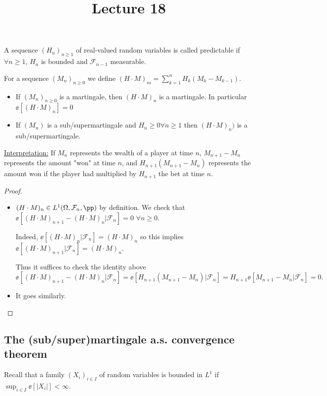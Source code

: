 \documentclass[../main.tex]{subfiles}
\title{Lecture 18}
\begin{document}
\begin{proposition}
  A sequence $(H_n)_{n \geq 1}$ of real-valued random variables is called
  predictable if $\forall n \geq 1$, $H_n$ is bounded and $\mathcal{F}_{n-1}$
  measurable.

  For a sequence $(M_n)_{n \geq 0}$ we define $(H \cdot M)_{m} = \sum_{k=1}^n
  H_k(M_k - M_{k-1})$.
  \begin{itemize}
    \item If $(M_n)_{n \geq 0}$ is a martingale, then $(H \cdot M)_n$ is a
      martingale. In particular $\ee[(H \cdot M)_n] = 0$
    \item If $(M_n)$ is a sub/supermartingale and $H_n \geq 0 \forall n \geq 1$ 
      then  $(H \cdot M)_n)$ is a sub/supermartingale.
  \end{itemize}
\end{proposition}
\underline{Interpretation:} If $M_n$ represents the wealth of a player at time
$n$, $M_{n+1} - M_n$ represents the amount "won" at time $n$, and
$H_{n+1}(M_{n+1} - M_n)$ represents the amount won if the player had multiplied
by $H_{n+1}$ the bet at time $n$.

\begin{proof}
    \hfill
    \begin{itemize}
      \item $(H \cdot M)_{n} \in L^1(\Omega, \mathcal{F}_n, \pp)$ by definition.
        We check that $\ee[(H \cdot M)_{n+1} - (H \cdot M)_{n} | \mathcal{F}_n]
        = 0$ $\forall n \geq 0$.

        Indeed, $\ee[(H \cdot M)_n | \mathcal{F}_n] = (H \cdot M)_{n}$ so this
        implies $\ee[(H \cdot M)_{n+1} | \mathcal{F}_n] = (H \cdot M)_{n}$.

        Thus it suffices to check the identity above
        \[
          \ee[(H \cdot M)_{n+1}- (H \cdot M)_n | \mathcal{F}_n] =
          \ee[H_{n+1}(M_{n+1} - M_n) | \mathcal{F}_n] = H_{n+1} \ee[M_{n+1} -
          M_n | \mathcal{F}_n] = 0
        .\] 
    \item It goes similarly. 
    \end{itemize}
\end{proof}   

\subsection{The (sub/super)martingale a.s. convergence theorem}
Recall that a family $(X_i)_{i \in I}$ of random variables is bounded in $L^1$
if $\sup_{i \in I} \ee[|X_i|] < \infty$.
\end{document}
